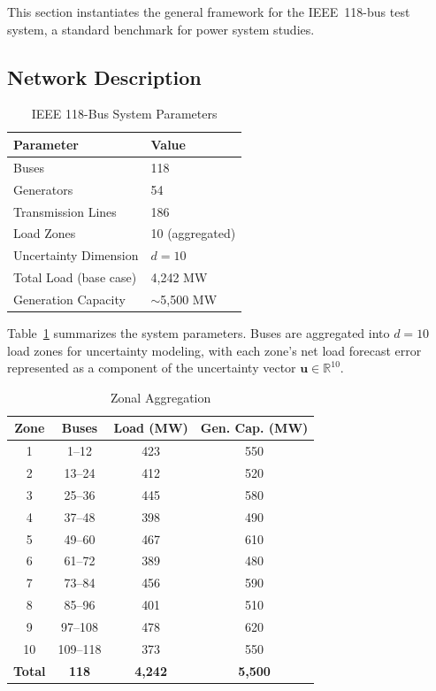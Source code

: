 \documentclass[lettersize,journal]{IEEEtran}
\newcommand{\R}{\mathbb{R}}
\newcommand{\bu}{\bm{u}}
\theoremstyle{definition}
\begin{document}
This section instantiates the general framework for the IEEE~118-bus test system, a standard benchmark for power system studies.

\subsection{Network Description}

\begin{table}[!t]
\caption{IEEE 118-Bus System Parameters}
\label{tab:system-params}
\centering
\begin{tabular}{ll}
\toprule
\textbf{Parameter} & \textbf{Value} \\
\midrule
Buses & 118 \\
Generators & 54 \\
Transmission Lines & 186 \\
Load Zones & 10 (aggregated) \\
Uncertainty Dimension & $d = 10$ \\
Total Load (base case) & 4,242 MW \\
Generation Capacity & $\sim$5,500 MW \\
\bottomrule
\end{tabular}
\end{table}

Table~\ref{tab:system-params} summarizes the system parameters. Buses are aggregated into $d = 10$ load zones for uncertainty modeling, with each zone's net load forecast error represented as a component of the uncertainty vector $\bu \in \R^{10}$.

\begin{table}[!t]
\caption{Zonal Aggregation}
\label{tab:zones}
\centering
\begin{tabular}{cccc}
\toprule
\textbf{Zone} & \textbf{Buses} & \textbf{Load (MW)} & \textbf{Gen. Cap. (MW)} \\
\midrule
1 & 1--12 & 423 & 550 \\
2 & 13--24 & 412 & 520 \\
3 & 25--36 & 445 & 580 \\
4 & 37--48 & 398 & 490 \\
5 & 49--60 & 467 & 610 \\
6 & 61--72 & 389 & 480 \\
7 & 73--84 & 456 & 590 \\
8 & 85--96 & 401 & 510 \\
9 & 97--108 & 478 & 620 \\
10 & 109--118 & 373 & 550 \\
\midrule
\textbf{Total} & \textbf{118} & \textbf{4,242} & \textbf{5,500} \\
\bottomrule
\end{tabular}
\end{table}
\end{document}
